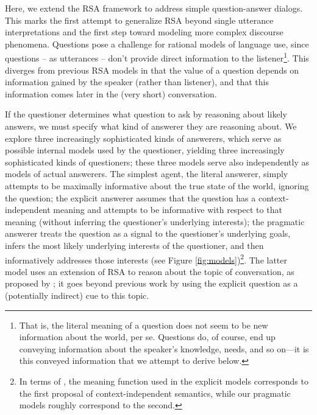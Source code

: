 \documentclass[12pt, floatsintext, jou]{apa6}
\begin{document}
Here, we extend the RSA framework to address simple question-answer dialogs. This marks the first attempt to generalize RSA beyond single utterance interpretations and the first step toward modeling more complex discourse phenomena.
Questions pose a challenge for rational models of language use, since questions -- as utterances -- don't provide direct information to the listener\footnote{That is, the literal meaning of a question does not seem to be new information about the world, per se. Questions do, of course, end up conveying information about the speaker's knowledge, needs, and so on---it is this conveyed information that we attempt to derive below.}. This diverges from previous RSA models in that the value of a question depends on information gained by the speaker (rather than listener), and that this information comes later in the (very short) conversation. 

If the questioner determines what question to ask by reasoning about likely answers, we must specify what kind of answerer they are reasoning about. We explore three increasingly sophisticated kinds of answerers, which serve as possible internal models used by the questioner, yielding three increasingly sophisticated kinds of questioners; these three models serve also independently as models of actual answerers. 
The simplest agent, the literal answerer, simply attempts to be maximally informative about the true state of the world, ignoring the question;   
the explicit answerer assumes that the question has a context-independent meaning and attempts to be informative with respect to that meaning (without inferring the questioner's underlying interests);  
the pragmatic answerer treats the question as a signal to the questioner's underlying goals, infers the most likely underlying interests of the questioner, and then informatively addresses those interests (see Figure \ref{fig:models})\footnote{In terms of , the meaning function used in the explicit models corresponds to the first proposal of context-independent semantics, while our pragmatic models roughly correspond to the second.}. 
The latter model uses an extension of RSA to reason about the topic of conversation, as proposed by ; it goes beyond previous work by using the explicit question as a (potentially indirect) cue to this topic. 

\label{sec:model}
\end{document}
